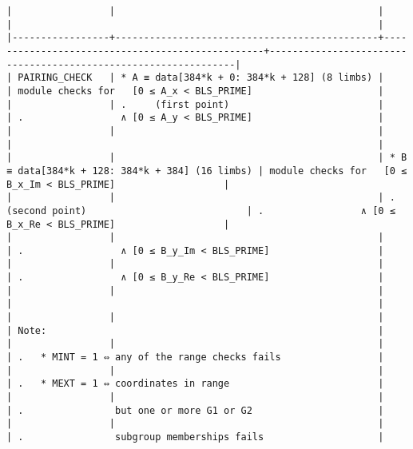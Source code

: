\documentclass[varwidth=\maxdimen,margin=0.5cm,multi={verbatim}]{standalone}
\begin{document}
\begin{verbatim}
|                 |                                              |                                                 |                                                                |
|-----------------+----------------------------------------------+-------------------------------------------------+----------------------------------------------------------------|
| PAIRING_CHECK   | * A ≡ data[384*k + 0: 384*k + 128] (8 limbs) |                                                 | module checks for   [0 ≤ A_x < BLS_PRIME]                      |
|                 | .     (first point)                          |                                                 | .                 ∧ [0 ≤ A_y < BLS_PRIME]                      |
|                 |                                              |                                                 |                                                                |
|                 |                                              | * B ≡ data[384*k + 128: 384*k + 384] (16 limbs) | module checks for   [0 ≤ B_x_Im < BLS_PRIME]                   |
|                 |                                              | .     (second point)                            | .                 ∧ [0 ≤ B_x_Re < BLS_PRIME]                   |
|                 |                                              |                                                 | .                 ∧ [0 ≤ B_y_Im < BLS_PRIME]                   |
|                 |                                              |                                                 | .                 ∧ [0 ≤ B_y_Re < BLS_PRIME]                   |
|                 |                                              |                                                 |                                                                |
|                 |                                              |                                                 | Note:                                                          |
|                 |                                              |                                                 | .   * MINT = 1 ⇔ any of the range checks fails                 |
|                 |                                              |                                                 | .   * MEXT = 1 ⇔ coordinates in range                          |
|                 |                                              |                                                 | .                but one or more G1 or G2                      |
|                 |                                              |                                                 | .                subgroup memberships fails                    |

\end{verbatim}
\end{document}
